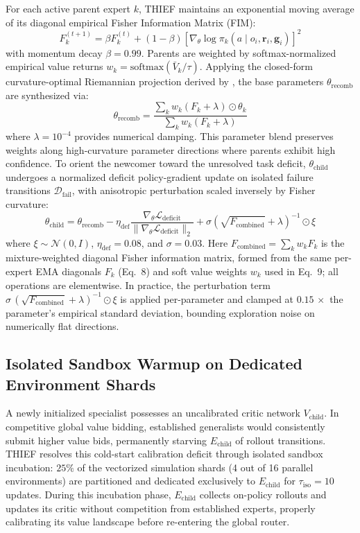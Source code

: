 For each active parent expert $k$, THIEF maintains an exponential moving average of its diagonal empirical Fisher Information Matrix (FIM):
\begin{equation}
F_k^{(t+1)} = \beta F_k^{(t)} + (1-\beta) \left[\nabla_\theta \log \pi_k(a \mid o_i, \mathbf{r}_i, \mathbf{g}_i)\right]^2
\end{equation}
with momentum decay $\beta = 0.99$. Parents are weighted by softmax-normalized empirical value returns $w_k = \text{softmax}(\bar{V}_k / \tau)$. Applying the closed-form curvature-optimal Riemannian projection derived by \citet{matena2021merging}, the base parameters $\theta_{\text{recomb}}$ are synthesized via:
\begin{equation}
\theta_{\text{recomb}} = \frac{\sum_k w_k (F_k + \lambda) \odot \theta_k}{\sum_k w_k (F_k + \lambda)}
\end{equation}
where $\lambda = 10^{-4}$ provides numerical damping. This parameter blend preserves weights along high-curvature parameter directions where parents exhibit high confidence. To orient the newcomer toward the unresolved task deficit, $\theta_{\text{child}}$ undergoes a normalized deficit policy-gradient update on isolated failure transitions $\mathcal{D}_{\text{fail}}$, with anisotropic perturbation scaled inversely by Fisher curvature:
\begin{equation}
\theta_{\text{child}} = \theta_{\text{recomb}} - \eta_{\text{def}} \frac{\nabla_\theta \mathcal{L}_{\text{deficit}}}{\|\nabla_\theta \mathcal{L}_{\text{deficit}}\|_2} + \sigma \left(\sqrt{F_{\text{combined}}} + \lambda\right)^{-1} \odot \xi
\end{equation}
where $\xi \sim \mathcal{N}(0, I)$, $\eta_{\text{def}} = 0.08$, and $\sigma = 0.03$. Here $F_{\text{combined}} = \sum_k w_k F_k$ is the mixture-weighted diagonal Fisher information matrix, formed from the same per-expert EMA diagonals $F_k$ (Eq.~8) and soft value weights $w_k$ used in Eq.~9; all operations are elementwise. In practice, the perturbation term $\sigma\,(\sqrt{F_{\text{combined}}} + \lambda)^{-1} \odot \xi$ is applied per-parameter and clamped at $0.15\,\times$ the parameter's empirical standard deviation, bounding exploration noise on numerically flat directions.

\subsection{Isolated Sandbox Warmup on Dedicated Environment Shards}
A newly initialized specialist possesses an uncalibrated critic network $V_{\text{child}}$. In competitive global value bidding, established generalists would consistently submit higher value bids, permanently starving $E_{\text{child}}$ of rollout transitions. THIEF resolves this cold-start calibration deficit through isolated sandbox incubation: $25\%$ of the vectorized simulation shards (4 out of 16 parallel environments) are partitioned and dedicated exclusively to $E_{\text{child}}$ for $\tau_{\text{iso}} = 10$ updates. During this incubation phase, $E_{\text{child}}$ collects on-policy rollouts and updates its critic without competition from established experts, properly calibrating its value landscape before re-entering the global router.

